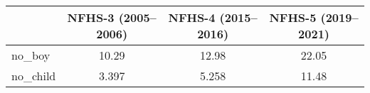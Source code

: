 {
\def\sym#1{\ifmmode^{#1}\else\(^{#1}\)\fi}
\begin{tabular}{l*{3}{c}}
\hline\hline
            &\multicolumn{1}{c}{NFHS-3 (2005–2006)}&\multicolumn{1}{c}{NFHS-4 (2015–2016)}&\multicolumn{1}{c}{NFHS-5 (2019–2021)}\\
\hline
\hline
no\_boy      &       10.29         &       12.98         &       22.05         \\
no\_child    &       3.397         &       5.258         &       11.48         \\
\hline\hline

\end{tabular}
}
